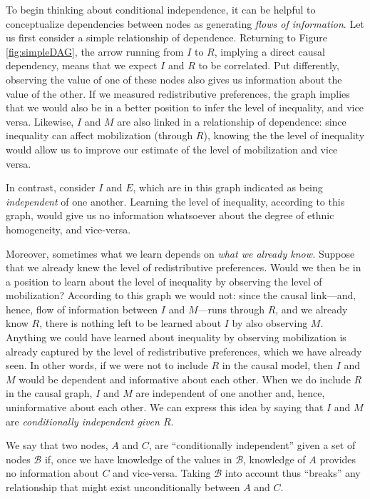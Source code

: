 \documentclass[
  12pt,
]{book}
\begin{document}
To begin thinking about conditional independence, it can be helpful to conceptualize dependencies between nodes as generating \emph{flows of information}. Let us first consider a simple relationship of dependence. Returning to Figure \ref{fig:simpleDAG}, the arrow running from \(I\) to \(R\), implying a direct causal dependency, means that we expect \(I\) and \(R\) to be correlated. Put differently, observing the value of one of these nodes also gives us information about the value of the other. If we measured redistributive preferences, the graph implies that we would also be in a better position to infer the level of inequality, and vice versa. Likewise, \(I\) and \(M\) are also linked in a relationship of dependence: since inequality can affect mobilization (through \(R\)), knowing the the level of inequality would allow us to improve our estimate of the level of mobilization and vice versa.

In contrast, consider \(I\) and \(E\), which are in this graph indicated as being \emph{independent} of one another. Learning the level of inequality, according to this graph, would give us no information whatsoever about the degree of ethnic homogeneity, and vice-versa.

Moreover, sometimes what we learn depends on \emph{what we already know.} Suppose that we already knew the level of redistributive preferences. Would we then be in a position to learn about the level of inequality by observing the level of mobilization? According to this graph we would not: since the causal link---and, hence, flow of information between \(I\) and \(M\)---runs through \(R\), and we already know \(R\), there is nothing left to be learned about \(I\) by also observing \(M\). Anything we could have learned about inequality by observing mobilization is already captured by the level of redistributive preferences, which we have already seen. In other words, if we were not to include \(R\) in the causal model, then \(I\) and \(M\) would be dependent and informative about each other. When we do include \(R\) in the causal graph, \(I\) and \(M\) are independent of one another and, hence, uninformative about each other. We can express this idea by saying that \(I\) and \(M\) are \emph{conditionally independent given \(R\)}.

We say that two nodes, \(A\) and \(C\), are ``conditionally independent'' given a set of nodes \(\mathcal B\) if, once we have knowledge of the values in \(\mathcal B\), knowledge of \(A\) provides no information about \(C\) and vice-versa. Taking \(\mathcal B\) into account thus ``breaks'' any relationship that might exist unconditionally between \(A\) and \(C\).
\end{document}
